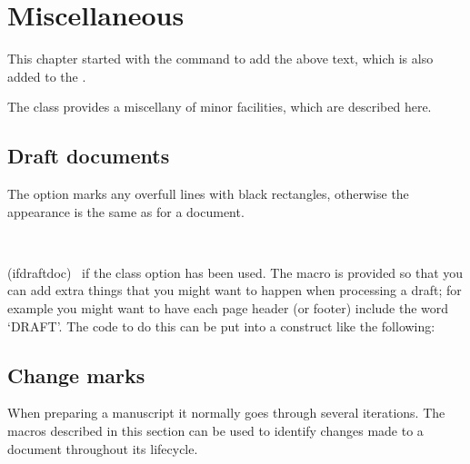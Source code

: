 
\chapter{Miscellaneous} \label{chap:misc}

\setlength{\prechapterprecisshift}{-\onelineskip}


\noindent    This chapter started with the \cmd{\chapterprecis} command to add
the above text, which is also added to the \prtoc.

    The class provides a miscellany of minor facilities, which are described
here.

\section{Draft documents}

  The  option marks any overfull lines with black rectangles,
otherwise the appearance is the same as for a  document.

\begin{syntax}
 \\
\end{syntax}
\glossary(ifdraftdoc)%
  {}%
  {\ptrue\ if the  class option has been used.}
The  macro is provided so that you can add extra
things that you might want to happen when processing a draft; for example
you might want to have each page header (or footer) include the word `DRAFT'.
The code to do this can be put into a construct like the following:
\begin{lcode}
\ifdraftdoc
\else
\fi
\end{lcode}


\section{Change marks}

    When preparing a manuscript it normally goes through several iterations.
The macros described in this section can be used to identify changes made to 
a document throughout its lifecycle.

